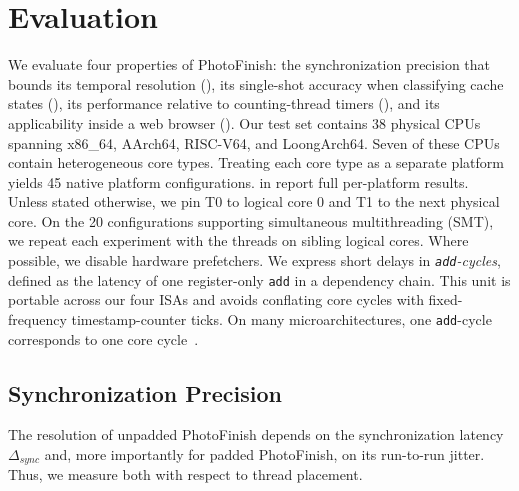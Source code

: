 \documentclass[letterpaper,twocolumn,10pt]{article} %
\newcommand{\AttackName}{PhotoFinish\xspace}
\newcommand{\PlatformCount}{38\xspace}
\newcommand{\tprobe}{{\fontfamily{cmtt}\selectfont T0}\xspace}
\newcommand{\tref}{{\fontfamily{cmtt}\selectfont T1}\xspace}
\newcommand{\rdelta}[1]{$\Delta_{#1}$}
\begin{document}
\section{Evaluation}\label{sec:evaluation}

We evaluate four properties of \AttackName: the synchronization precision that bounds its temporal resolution (), its single-shot accuracy when classifying cache states (), its performance relative to counting-thread timers (), and its applicability inside a web browser ().
Our test set contains \PlatformCount physical CPUs spanning x86\_64, AArch64, RISC-V64, and LoongArch64.
Seven of these CPUs contain heterogeneous core types.
Treating each core type as a separate platform yields \num{45} native platform configurations.
 in  report full per-platform results.
Unless stated otherwise, we pin \tprobe to logical core 0 and \tref to the next physical core.
On the \num{20} configurations supporting simultaneous multithreading (SMT), we repeat each experiment with the threads on sibling logical cores.
Where possible, we disable hardware prefetchers.
We express short delays in \emph{\texttt{add}-cycles}, defined as the latency of one register-only \texttt{add} in a dependency chain.
This unit is portable across our four ISAs and avoids conflating core cycles with fixed-frequency timestamp-counter ticks.
On many microarchitectures, one \texttt{add}-cycle corresponds to one core cycle~\cite{abel2019uops,Intel_combined}.


\subsection{Synchronization Precision}\label{subsec:delta-sync}

The resolution of unpadded \AttackName depends on the synchronization latency \rdelta{sync} and, more importantly for padded \AttackName, on its run-to-run jitter.
Thus, we measure both with respect to thread placement.
\end{document}

